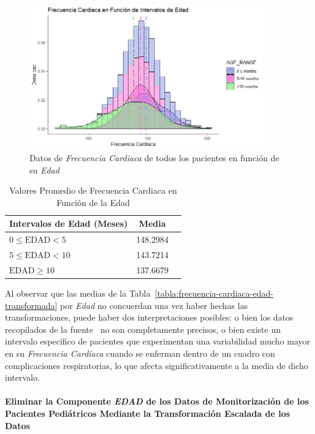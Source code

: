 \begin{figure}[H]
    \centering
    \includegraphics[width=0.9\textwidth]{img/frecuencia-cardiaca-edad.png}
    \caption{Datos de \textit{Frecuencia Cardiaca} de todos los pacientes en función de su \textit{Edad}}
    \label{fig:frecuencia-cardiaca-edad}
\end{figure}

\begin{table}[H]
    \centering
    \begin{tabular}{lcc}
        \toprule
        \textbf{Intervalos de Edad (Meses)} & \textbf{Media} \\
        \midrule
        $0 \leq \text{EDAD} < 5$ & 148.2984 \\
        $5 \leq \text{EDAD} < 10$ & 143.7214 \\
        $\text{EDAD} \geq 10$ & 137.6679 \\
        \bottomrule
    \end{tabular}
    \caption{Valores Promedio de Frecuencia Cardiaca en Función de la Edad}
    \label{tabla:frecuencia-cardiaca-edad}
\end{table}

Al observar que las medias de la Tabla~\ref{tabla:frecuencia-cardiaca-edad-transformada} por \textit{Edad} no concuerdan una vez haber hechas las transformaciones, puede haber dos interpretaciones posibles: o bien los datos recopilados de la fuente~\cite{percentilesFenton2015} no son completamente precisos, o bien existe un intervalo específico de pacientes que experimentan una variabilidad mucho mayor en su \textit{Frecuencia Cardíaca} cuando se enferman dentro de un cuadro con complicaciones respiratorias, lo que afecta significativamente a la media de dicho intervalo.

\paragraph{Eliminar la Componente \textit{EDAD} de los Datos de Monitorización de los Pacientes Pediátricos Mediante la Transformación Escalada de los Datos}\label{sec:eliminar-edad-2} \\

